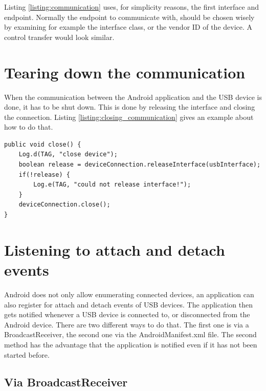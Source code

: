 Listing \ref{listing:communication} uses, for simplicity reasons, the first interface and endpoint. Normally the endpoint to communicate with, should be chosen wisely by examining for example the interface class, or the vendor ID of the device. A control transfer would look similar.

\section{Tearing down the communication}

When the communication between the Android application and the USB device is done, it has to be shut down. This is done by releasing the interface and closing the connection. Listing \ref{listing:closing_communication} gives an example about how to do that.

\begin{lstlisting}[caption=Closing communication, label=listing:closing_communication]
public void close() {
	Log.d(TAG, "close device");
	boolean release = deviceConnection.releaseInterface(usbInterface);
	if(!release) {
		Log.e(TAG, "could not release interface!");
	}
	deviceConnection.close();
}
\end{lstlisting}

\section{Listening to attach and detach events}

Android does not only allow enumerating connected devices, an application can also register for attach and detach events of USB devices. The application then gets notified whenever a USB device is connected to, or disconnected from the Android device. There are two different ways to do that. The first one is via a BroadcastReceiver, the second one via the AndroidManifest.xml file. The second method has the advantage that the application is notified even if it has not been started before.

\subsection{Via BroadcastReceiver}

